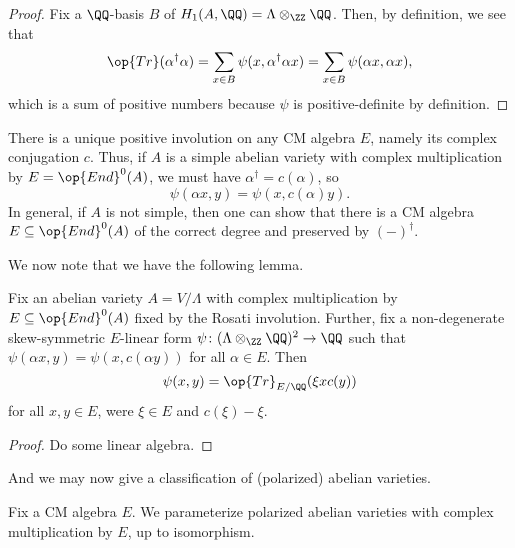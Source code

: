 \documentclass[../notes.tex]{subfiles}
\begin{document}
\begin{proof}
	Fix a $\QQ$-basis $B$ of $H_1(A,\QQ)=\Lambda\otimes_\ZZ\QQ$. Then, by definition, we see that
	\[\op{Tr}(\alpha^\dag\alpha)=\sum_{x\in B}\psi(x,\alpha^\dag\alpha x)=\sum_{x\in B}\psi(\alpha x,\alpha x),\]
	which is a sum of positive numbers because $\psi$ is positive-definite by definition.
\end{proof}
\begin{remark}
	There is a unique positive involution on any CM algebra $E$, namely its complex conjugation $c$. Thus, if $A$ is a simple abelian variety with complex multiplication by $E=\op{End}^0(A)$, we must have $\alpha^\dag=c(\alpha)$, so
	\[\psi(\alpha x,y)=\psi(x,c(\alpha)y).\]
	In general, if $A$ is not simple, then one can show that there is a CM algebra $E\subseteq\op{End}^0(A)$ of the correct degree and preserved by $(-)^\dag$.
\end{remark}
We now note that we have the following lemma.
\begin{lemma}
	Fix an abelian variety $A=V/\Lambda$ with complex multiplication by $E\subseteq\op{End}^0(A)$ fixed by the Rosati involution. Further, fix a non-degenerate skew-symmetric $E$-linear form $\psi\colon(\Lambda\otimes_\ZZ\QQ)^2\to\QQ$ such that $\psi(\alpha x,y)=\psi(x,c(\alpha y))$ for all $\alpha\in E$. Then
	\[\psi(x,y)=\op{Tr}_{E/\QQ}(\xi xc(y))\]
	for all $x,y\in E$, were $\xi\in E$ and $c(\xi)-\xi$.
\end{lemma}
\begin{proof}
	Do some linear algebra.
\end{proof}
And we may now give a classification of (polarized) abelian varieties.
\begin{theorem}
	Fix a CM algebra $E$. We parameterize polarized abelian varieties with complex multiplication by $E$, up to isomorphism.
\end{theorem}
\end{document}
